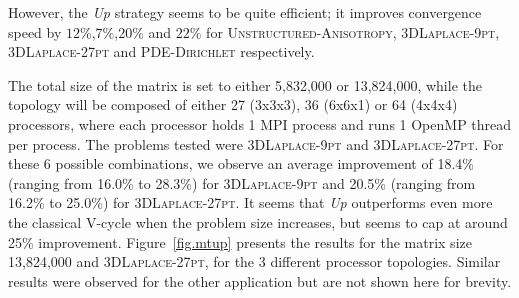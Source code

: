 However, the \emph{Up} strategy seems to be quite efficient; it improves
convergence speed by $12\%$,$7\%$,$20\%$ and $22\%$ for
\textsc{Unstructured-Anisotropy}, \textsc{3DLaplace-9pt},
\textsc{3DLaplace-27pt} and \textsc{PDE-Dirichlet} respectively.


The total size of the matrix is set to either 5,832,000 or 13,824,000, while
the topology will be composed of either 27 (3x3x3), 36 (6x6x1) or 64 (4x4x4)
processors, where each processor holds 1 MPI process and runs 1 OpenMP
thread per process. The problems tested were \textsc{3DLaplace-9pt} and
\textsc{3DLaplace-27pt}.  For these 6 possible combinations, we observe an
average improvement of 18.4\% (ranging from 16.0\% to 28.3\%) for
\textsc{3DLaplace-9pt} and 20.5\% (ranging from 16.2\% to 25.0\%) for
\textsc{3DLaplace-27pt}. It seems that \emph{Up} outperforms even more the
classical V-cycle when the problem size increases, but seems to cap at around
25\% improvement. Figure~\ref{fig.mtup} presents the results for the matrix
size 13,824,000 and \textsc{3DLaplace-27pt}, for the 3 different processor
topologies. Similar results were observed for the other application but are not
shown here for brevity.

